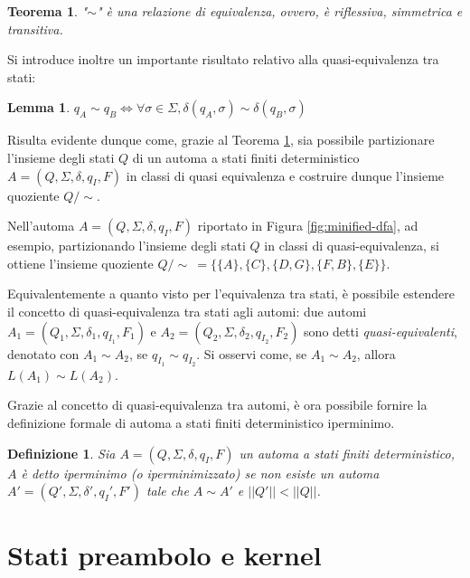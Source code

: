 \documentclass[a4paper,12pt]{report} %
\newcommand{\partitioned}[2]{#1\slash\!\!#2}  %
\newtheorem{theorem}{Teorema}[chapter]        %
\newtheorem{definition}{Definizione}[chapter] %
\newtheorem{lemma}{Lemma}[chapter]            %
\begin{document}
\begin{theorem}\label{th:aeq-rel-states}
  "$\sim$" è una relazione di equivalenza, ovvero, è riflessiva, simmetrica e transitiva.
\end{theorem}

Si introduce inoltre un importante risultato relativo alla quasi-equivalenza tra stati:

\begin{lemma}\label{lem:aeq-states}
  $q_A \sim q_B \Leftrightarrow \forall \sigma \in \Sigma, \delta(q_A, \sigma) \sim \delta(q_B, \sigma)$
\end{lemma}

Risulta evidente dunque come, grazie al Teorema \ref{th:aeq-rel-states}, sia possibile partizionare l'insieme 
degli stati $Q$ di un automa a stati finiti deterministico $A = (Q, \Sigma, \delta, q_I, F)$ in classi di quasi 
equivalenza e costruire dunque l'insieme quoziente $\partitioned{Q}{\sim}$.

Nell'automa $A = (Q, \Sigma, \delta, q_I, F)$ riportato in Figura \ref{fig:minified-dfa}, ad esempio, 
partizionando l'insieme degli stati $Q$ in classi di quasi-equivalenza, si ottiene l'insieme quoziente 
$\partitioned{Q}{\sim} \ = \{ \{ A \}, \{ C \}, \{ D, G \}, \{ F, B \}, \{ E \} \}$.

Equivalentemente a quanto visto per l'equivalenza tra stati, è possibile estendere il concetto di quasi-equivalenza
tra stati agli automi: due automi $A_1 = (Q_1, \Sigma, \delta_1,\allowbreak q_{I_1}, F_1)$ e 
$A_2 = (Q_2, \Sigma, \delta_2, q_{I_2}, F_2)$ sono detti \emph{quasi-equivalenti}, denotato con $A_1 \sim A_2$,
se $q_{I_1} \sim q_{I_2}$. Si osservi come, se $A_1 \sim A_2$, allora $L(A_1) \sim L(A_2)$.

Grazie al concetto di quasi-equivalenza tra automi, è ora possibile fornire la
definizione formale di automa a stati finiti deterministico iperminimo.

\begin{definition}\label{def:hyper-min-dfa}
  Sia $A = (Q, \Sigma, \delta, q_I, F)$ un automa a stati finiti deterministico, $A$ è detto \emph{iperminimo}
  (o \emph{iperminimizzato}) se non esiste un automa $A' = (Q', \Sigma, \delta', q_I', F')$ tale che $A \sim A'$
  e $||Q'|| < ||Q||$.
\end{definition}

\section{Stati preambolo e kernel}
\label{sec:preamble-kernel}
\end{document}
